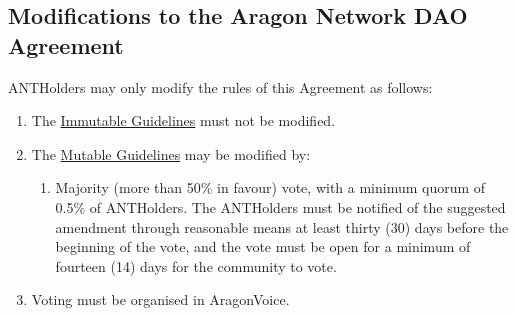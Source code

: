 \subsection{Modifications to the Aragon Network DAO Agreement}
\glspl{ANTHolder} may only modify the rules of this Agreement as follows:
\begin{enumerate}
	\item The \hyperref[sec:ImmutableGuidelines]{Immutable Guidelines} must not be modified.
	\item The \hyperref[sec:MutableGuidelines]{Mutable Guidelines} may be modified by:
	\begin{enumerate}
		\item Majority (more than 50\% in favour) vote, with a minimum quorum of 0.5\% of \glspl{ANTHolder}.
		The \glspl{ANTHolder} must be notified of the suggested amendment through reasonable means at least thirty (30) days before the beginning of the vote, and the vote must be open for a minimum of fourteen (14) days for the community to vote.
	\end{enumerate}
	\item  Voting must be organised in \gls{AragonVoice}.
\end{enumerate}


